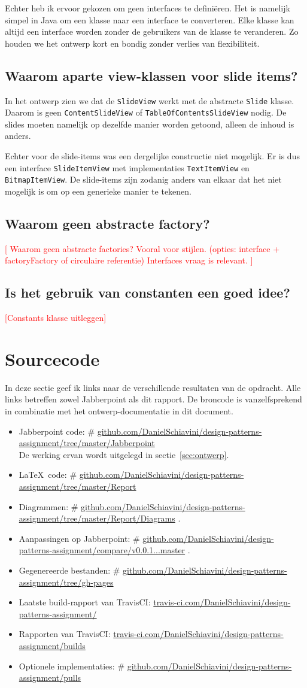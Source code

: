 \documentclass[a4paper]{article}
\makeatletter
\newcommand{\todo}[1]{\textcolor{red}{[#1]}\\}
\newcommand*{\repo}{\begingroup\@makeother\#\@repo}
\newcommand*{\@repo}[2]{%
  \href{https://github.com/DanielSchiavini/design-patterns-assignment/#1}{#2}%
  \endgroup}
\newcommand{\repolink}[1]{\repo{#1}{github.com\-/Daniel\-Schiavini\-/de\-sign-\-pat\-terns-\-as\-sign\-ment\-/#1}}
\newcommand{\cilink}[1]{\href{https://travis-ci.com/DanielSchiavini/design-patterns-assignment/#1}{travis-ci.com/DanielSchiavini/design-patterns-assignment/#1}}
\newcommand{\question}[1]{
  \subsection{#1}
}
\newcommand{\code}[1]{\lstinline[columns=fixed]{#1}}
\makeatother
\begin{document}
		Echter heb ik ervoor gekozen om geen interfaces te definiëren.
		Het is namelijk simpel in Java om een klasse naar een interface te converteren.
		Elke klasse kan altijd een interface worden zonder de gebruikers van de klasse te veranderen.
		Zo houden we het ontwerp kort en bondig zonder verlies van flexibiliteit.

	\question{Waarom aparte view-klassen voor slide items?}
		In het ontwerp zien we dat de \code{SlideView} werkt met de abstracte \code{Slide} klasse.
		Daarom is geen \code{ContentSlideView} of \code{TableOfContentsSlideView} nodig.
		De slides moeten namelijk op dezelfde manier worden getoond, alleen de inhoud is anders.

		Echter voor de slide-items was een dergelijke constructie niet mogelijk.
		Er is dus een interface \code{SlideItemView} met implementaties \code{TextItemView} en \code{BitmapItemView}.
		De slide-items zijn zodanig anders van elkaar dat het niet mogelijk is om op een generieke manier te tekenen.

	\question{Waarom geen abstracte factory?}
		\todo{
			Waarom geen abstracte factories?
			Vooral voor stijlen. (opties: interface + factoryFactory of circulaire referentie)
			Interfaces vraag is relevant.
		}

	\question{Is het gebruik van constanten een goed idee?}
		\todo{Constants klasse uitleggen}

\section{Sourcecode}\label{sec:source}
	In deze sectie geef ik links naar de verschillende resultaten van de opdracht.
	Alle links betreffen zowel Jabberpoint als dit rapport.
	De broncode is vanzelfsprekend in combinatie met het ontwerp-documentatie in dit document.
	\begin{itemize}
		\item Jabberpoint code:
			\repolink{tree/master/Jabberpoint}\\
			De werking ervan wordt uitgelegd in sectie~\ref{sec:ontwerp}.
		\item \LaTeX ~code:
			\repo{tree/master/Report}{github.com/DanielSchiavini/design-patterns-assignment/tree\-/master\-/Report}
		\item Diagrammen:
			\repolink{tree/master/Report/Diagrams}.
		\item Aanpassingen op Jabberpoint:
			\repolink{compare/v0.0.1...master}.
		\item Gegenereerde bestanden:
			\repolink{tree/gh-pages}
		\item Laatste build-rapport van TravisCI:
			\cilink{}
		\item Rapporten van TravisCI:
			\cilink{builds}
		\item Optionele implementaties:
			\repolink{pulls}
	\end{itemize}
\end{document}

